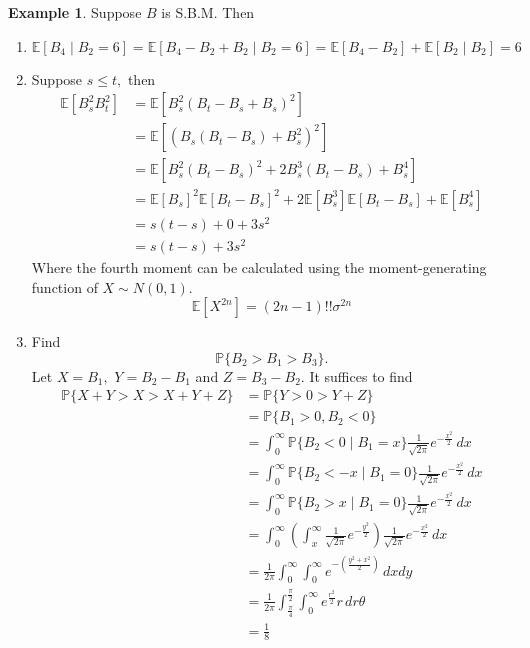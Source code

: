 \documentclass[10pt, oneside]{article}
\newcommand{\bbP}{\mathbb{P}}
\newcommand{\bbE}{\mathbb{E}}
\theoremstyle{definition}
\newtheorem{exmp}{Example}[section]
\begin{document}
\begin{exmp}
    Suppose $B$ is S.B.M. Then 
    \begin{enumerate}
        \item 
        \[\bbE[B_4 \mid B_2 = 6] = \bbE[B_4 - B_2 + B_2 \mid B_2 = 6] = \bbE[B_4- B_2] + \bbE[B_2 \mid B_2] = 6\]
        \item  Suppose $s\leq t,$ then
        \begin{align*}
           \bbE[B_s^2 B_t^2] &= \bbE[B_s^2(B_t - B_s + B_s)^2]\\
           &= \bbE[\left(B_s(B_t - B_s)+ B_s^2\right)^2]\\
           &= \bbE[B_s^2(B_t - B_s)^2 + 2B_s^3(B_t - B_s) + B_s^4]\\
           &= \bbE[B_s]^2\bbE[B_t - B_s]^2 + 2\bbE[B_s^3]\bbE[B_t - B_s]+ \bbE[B_s^4]\\
           &= s(t-s) + 0 + 3s^2\\
           &= s(t-s) + 3s^2
        \end{align*}
        Where the fourth moment can be calculated using the moment-generating function of $X\sim N(0,1).$ 
        \[\bbE[X^{2n}]= (2n-1)!! \sigma^{2n}\]
        \item Find 
        \[\bbP\{B_2 >B_1 > B_3\}.\] Let $X = B_1,$ $Y = B_2 - B_1$ and $Z = B_3 -B_2.$ It suffices to find
        \begin{align*}
            \bbP\{X + Y > X > X + Y  + Z\} &= \bbP\{Y >0 > Y + Z\}\\
            &= \bbP\{B_1 >0, B_2 < 0\}\\
            &= \int_0^\infty\bbP\{B_2 < 0 \mid B_1  = x\}\frac{1}{\sqrt{2\pi }}e^{-\frac{x^2}{2}}\,dx\\
            &= \int_0^\infty\bbP\{B_2 < -x \mid B_1  = 0\}\frac{1}{\sqrt{2\pi }}e^{-\frac{x^2}{2}}\,dx\\
            &= \int_0^\infty\bbP\{B_2 > x \mid B_1  = 0\}\frac{1}{\sqrt{2\pi }}e^{-\frac{x^2}{2}}\,dx\\
            &= \int_0^\infty\left(\int_x^\infty  \frac{1}{\sqrt{2\pi}}e^{-\frac{y^2}{2}}\right)\frac{1}{\sqrt{2\pi }}e^{-\frac{x^2}{2}}\,dx\\
            &= \frac{1}{2\pi}\int_0^\infty \int_0^\infty e^{-(\frac{y^2 + x^2}{2})}\,dxdy\\
            &= \frac{1}{2\pi}\int_\frac{\pi}{4}^{\frac{\pi}{2}}\int_0^\infty e^{\frac{r^2}{2}}r\,dr\theta\\
            &= \frac{1}{8}
        \end{align*}
    \end{enumerate}
\end{exmp}
\end{document}
